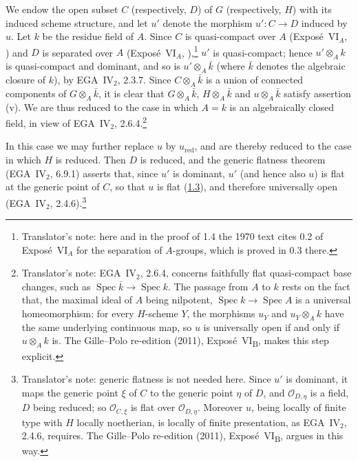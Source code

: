 We endow the open subset \(C\) (respectively, \(D\)) of \(G\)
(respectively, \(H\)) with its induced scheme structure, and let \(u'\)
denote the morphism \(u':C\to D\) induced by \(u\). Let \(k\) be the
residue field of \(A\). Since \(C\) is quasi-compact over \(A\)
(Expos\'e~VI\(_A\), ) and \(D\) is separated over \(A\)
(Expos\'e~VI\(_A\), ),\footnote{Translator's note: here and in the
proof of 1.4 the 1970 text cites 0.2 of Expos\'e~VI\(_A\) for the separation of \(A\)-groups, which is
proved in 0.3 there.} \(u'\) is quasi-compact; hence \(u'\otimes_Ak\) is
quasi-compact and dominant, and so is \(u'\otimes_A\bar k\) (where \(\bar k\)
denotes the algebraic closure of \(k\)), by EGA~IV\(_2\), 2.3.7. Since
\(C\otimes_A\bar k\) is a union of connected components of
\(G\otimes_A\bar k\), it is clear that \(G\otimes_A\bar k\),
\(H\otimes_A\bar k\) and \(u\otimes_A\bar k\) satisfy assertion \textup{(v)}.
We are thus reduced to the case in which \(A=k\) is an algebraically
closed field, in view of EGA~IV\(_2\), 2.6.4.\footnote{Translator's note: EGA~IV\(_2\), 2.6.4,
concerns faithfully flat quasi-compact base changes, such as \(\operatorname{Spec}\bar k\to
\operatorname{Spec}k\). The passage from \(A\) to \(k\) rests on the fact that, the maximal ideal of
\(A\) being nilpotent, \(\operatorname{Spec}k\to\operatorname{Spec}A\) is a universal homeomorphism: for
every \(H\)-scheme \(Y\), the morphisms \(u_Y\) and \(u_Y\otimes_Ak\) have the same underlying continuous
map, so \(u\) is universally open if and only if \(u\otimes_Ak\) is. The Gille--Polo re-edition (2011),
Expos\'e~VI\textsubscript{B}, makes this step explicit.}

In this case we may further replace \(u\) by \(u_{\mathrm{red}}\),
and are thereby reduced to the case in which \(H\) is reduced. Then \(D\)
is reduced, and the generic flatness theorem (EGA~IV\(_2\), 6.9.1) asserts
that, since \(u'\) is dominant, \(u'\) (and hence also \(u\)) is flat at the
generic point of \(C\), so that \(u\) is flat (\hyperref[prop:sga3-VIB-1.3]{1.3}), and therefore
universally open (EGA~IV\(_2\), 2.4.6).\footnote{Translator's note: generic flatness is not
needed here. Since \(u'\) is dominant, it maps the generic point \(\xi\) of \(C\) to the generic point
\(\eta\) of \(D\), and \(\mathcal O_{D,\eta}\) is a field, \(D\) being reduced; so \(\mathcal O_{C,\xi}\)
is flat over \(\mathcal O_{D,\eta}\). Moreover \(u\), being locally of finite type with \(H\) locally
noetherian, is locally of finite presentation, as EGA~IV\(_2\), 2.4.6, requires. The Gille--Polo
re-edition (2011), Expos\'e~VI\textsubscript{B}, argues in this way.}

